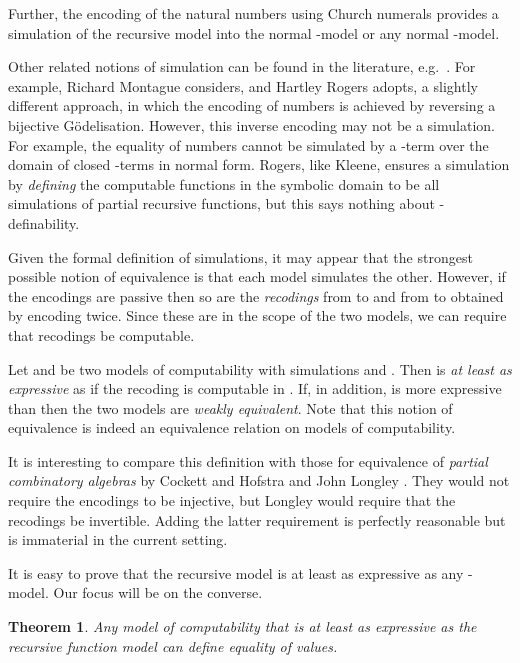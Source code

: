 \documentclass[a4paper]{article}
\newtheorem{theorem}{Theorem}
\begin{document}
Further, the encoding of the natural numbers using Church numerals
provides a simulation of the recursive model into the normal
-model or any normal -model.  


Other related notions of simulation can be found in the literature,
e.g.\ \cite{Jones97, BokerD06}.  For example, Richard Montague
\cite[page 430]{Montague60} considers, and Hartley Rogers \cite[page
28]{Rogers67} adopts, a slightly different approach, in which the
encoding of numbers is achieved by reversing a bijective
G\"odelisation.  However, this inverse encoding may not be a
simulation.  For example, the equality of numbers cannot be simulated
by a -term over the domain of closed -terms in normal form.
Rogers, like Kleene, ensures a simulation by {\em defining} the
computable functions in the symbolic domain to be all simulations of
partial recursive functions, but this says nothing about
-definability.

Given the formal definition of simulations, it may appear that the
strongest possible notion of equivalence is that each model simulates
the other. However, if the encodings are passive then so are the {\em
  recodings} from  to  and from  to  obtained by
encoding twice.  Since these are in the scope of the two models, we
can require that recodings be computable.

Let  and  be two models of
computability with simulations  and . Then  is {\em at least as expressive} as
 if the recoding 
is computable in . If, in addition,  is
more expressive than  then the two models are {\em
  weakly equivalent}. 
Note that this notion of equivalence is indeed an equivalence
relation on models of computability.

It is interesting to compare this definition with those for
equivalence of {\em partial combinatory algebras} by Cockett and
Hofstra \cite{CH2010} and John Longley \cite{Longley14}.  They would
not require the encodings to be injective, but Longley
would require that the recodings be invertible. Adding the latter
requirement is perfectly reasonable but is immaterial in the current
setting.


It is easy to prove that the recursive model is at least as expressive as
any -model. Our focus will be on the converse. 

\begin{theorem}
  Any model of computability that is at least as  expressive as the
  recursive function model can define equality of values.
\end{theorem}
\end{document}
